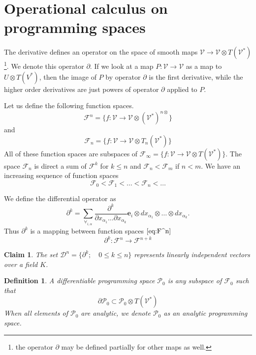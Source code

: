\documentclass[preprint,12pt]{elsarticle}
\newcommand{\VV}{\mathcal{V}}
\newcommand{\e}{\mathbf{e}}
\newcommand{\F}{\mathcal{F}}
\newcommand{\dP}{\mathcal{P}}
\newcommand{\D}{\partial}
\newcommand{\DD}{\mathcal{D}}
\newtheorem{definicija}{Definition}[section]
\newtheorem{trditev}{Claim}[section]
\begin{document}
\section{Operational calculus on programming spaces}\label{sec:operational}

The derivative defines an operator on the space of smooth maps $\VV\to \VV\otimes
 T(\VV^*)$\footnote{the operator $\D$ may be defined partially for other maps as
   well.}. We denote this operator $\D$. If we look at a map $P:\VV\to \VV$ as a map
 to $U\otimes T(V^*)$, then the image of $P$ by operator $\D$ is the first
 derivative, while the higher order derivatives are just powers of operator $\D$
 applied to $P$. 

Let us define the following function spaces.
 \begin{equation}\label{eq:F^n}
 	\F^n=\{f:\VV\to \VV\otimes(\VV^*)^{n\otimes}\}
 \end{equation}
 and
 \begin{equation}\label{eq:F_n}
 	\F_n=\{f:\VV\to \VV\otimes T_n(\VV^*)\}
 \end{equation}
All of these function spaces are subspaces of $\F_\infty=\{f:\VV\to \VV\otimes
T(\VV^*)\}$. The space $\F_n$ is direct a sum of $\F^k$ for $k\le n$ and $\F_n<\F_m$ if $n<m$. We
have an increasing sequence of function spaces
\begin{equation}
  \label{eq:flag_function_space}
  \F_0<\F_1<\ldots<\F_n<\ldots
\end{equation}

We define the differential operator as
\begin{equation}\label{eq:dd}
	\partial^k=\sum_{\forall_{i,\alpha}}\frac{\partial^k}{\partial
	    x_{\alpha_1}\ldots \partial x_{\alpha_k}}\e_i\otimes
	  dx_{\alpha_1}\otimes\ldots \otimes dx_{\alpha_k}.
\end{equation}
Thus $\D^k$ is a mapping between function spaces $\eqref{eq:F^n}$
 \begin{equation}\label{eq:toFn+k}
 \D^k:\F^n\to\F^{n+k}
 \end{equation}
 
 \begin{trditev}\label{izr:linearnaNeodvisnost}
  The set $\DD^n=\{\partial^k;\quad 0\le k\le n\}$ represents linearly independent vectors over a field $K$.
 \end{trditev}
 
 \begin{definicija}\label{def:dP}
 	A \emph{differentiable programming space} $\dP_0$ is any subspace of $\F_0$ such that
 	\begin{equation}\label{eq:P}
 	\D\dP_0\subset\dP_0\otimes T(\VV^*)
 	\end{equation}
 	When all elements of $\dP_0$ are analytic, we denote $\dP_0$ as an \emph{analytic programming space}.
 \end{definicija}
\end{document}
